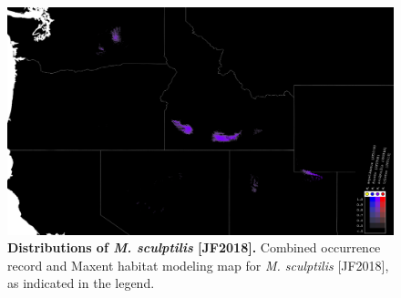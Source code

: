 \documentclass[fleqn,10pt,lineno]{wlpeerj} %
\begin{document}
\begin{figure}[h]
	\centering
	\begin{sideways}
		\includegraphics[height=0.8\textwidth]{sculptilis.png}
		\end{sideways}
	\caption{\textbf{Distributions of \textit{M. sculptilis} [JF2018].} Combined occurrence record and Maxent habitat modeling map for \textit{M. sculptilis} [JF2018], as indicated in the legend.}
	\label{fig:map_sculptilis}
\end{figure}
\end{document}
